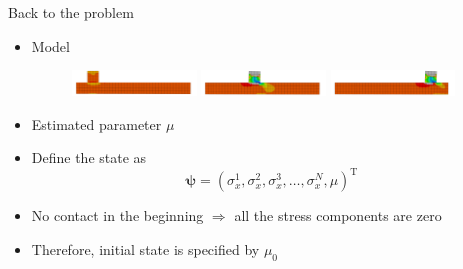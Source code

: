 \documentclass{beamer}
\begin{document}
\begin{frame}{Back to the problem}

\begin{itemize}
\item Model
\begin{figure}
\includegraphics[width=3.3cm]{anim1.pdf}
\includegraphics[width=3.3cm]{anim3.pdf}
\includegraphics[width=3.3cm]{anim5.pdf}
\end{figure}

\item Estimated parameter $\mu$
\item Define the state as
\[
  \boldsymbol{\psi} = (\sigma_x^1, \sigma_x^2, \sigma_x^3, \dots, \sigma_x^N, \mu)^\mathrm{T}
\]
\item No contact in the beginning $\Rightarrow$ all the stress components are zero
\item Therefore, initial state is specified by $\mu_0$
\end{itemize}

\end{frame}
\end{document}
